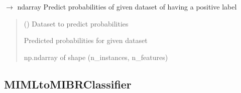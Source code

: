 \documentclass[letterpaper,10pt,english]{sphinxmanual}
\begin{document}
\begin{fulllineitems}
\begin{fulllineitems}
\label{\detokenize{classifier/mimlTOmi/_autosummary/miml.classifier.mimlTOmi.miml_to_mi_classifier.MIMLtoMIClassifier:miml.classifier.mimlTOmi.miml_to_mi_classifier.MIMLtoMIClassifier.predict_proba}}
\pysigstartsignatures
\pysiglinewithargsret
{}
{}
{{ $\rightarrow$ ndarray}}
\pysigstopsignatures
\sphinxAtStartPar
Predict probabilities of given dataset of having a positive label
\begin{quote}\begin{description}
\sphinxAtStartPar
{} ({\hyperref[\detokenize{data/_autosummary/miml.data.miml_dataset.MIMLDataset:miml.data.miml_dataset.MIMLDataset}]{}}) \textendash{} Dataset to predict probabilities

\sphinxAtStartPar
{} \textendash{} Predicted probabilities for given dataset

\sphinxAtStartPar
np.ndarray of shape (n\_instances, n\_features)

\end{description}\end{quote}

\end{fulllineitems}


\end{fulllineitems}


\sphinxstepscope


\subsection{MIMLtoMIBRClassifier}
\label{\detokenize{classifier/mimlTOmi/miml_to_mi_br_classifier:mimltomibrclassifier}}\label{\detokenize{classifier/mimlTOmi/miml_to_mi_br_classifier::doc}}
\end{document}
